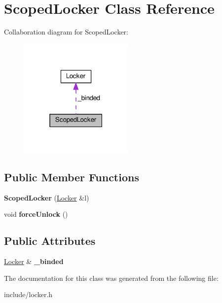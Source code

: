 \hypertarget{class_scoped_locker}{}\section{Scoped\+Locker Class Reference}
\label{class_scoped_locker}


Collaboration diagram for Scoped\+Locker\+:\nopagebreak
\begin{figure}[H]
\begin{center}
\leavevmode
\includegraphics[width=159pt]{class_scoped_locker__coll__graph}
\end{center}
\end{figure}
\subsection*{Public Member Functions}
\begin{DoxyCompactItemize}
\item 
{\bfseries Scoped\+Locker} (\hyperlink{class_locker}{Locker} \&l)\hypertarget{class_scoped_locker_a934b25a7af086a7230e96256ab2f54be}{}\label{class_scoped_locker_a934b25a7af086a7230e96256ab2f54be}

\item 
void {\bfseries force\+Unlock} ()\hypertarget{class_scoped_locker_a5a9c0873fb7c11ea588b627497208a41}{}\label{class_scoped_locker_a5a9c0873fb7c11ea588b627497208a41}

\end{DoxyCompactItemize}
\subsection*{Public Attributes}
\begin{DoxyCompactItemize}
\item 
\hyperlink{class_locker}{Locker} \& {\bfseries \+\_\+binded}\hypertarget{class_scoped_locker_abfc68c3a65391f09b81de01492bc60be}{}\label{class_scoped_locker_abfc68c3a65391f09b81de01492bc60be}

\end{DoxyCompactItemize}


The documentation for this class was generated from the following file\+:\begin{DoxyCompactItemize}
\item 
include/locker.\+h\end{DoxyCompactItemize}

